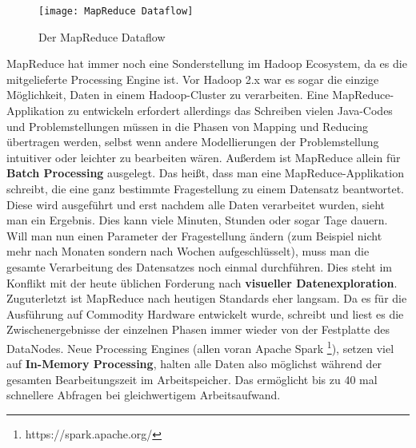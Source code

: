 \begin{figure}[ht]
    \centering
    \texttt{[image: MapReduce Dataflow]}
    \caption[Der MapReduce Dataflow]{Der MapReduce Dataflow\parencite[Seite 24, Figure 2-1]{white_hadoop_2015}}
    \label{fig:mapred dataflow}
\end{figure}

MapReduce hat immer noch eine Sonderstellung im Hadoop Ecosystem, da es die mitgelieferte Processing Engine ist. Vor Hadoop 2.x war es sogar die einzige Möglichkeit, Daten in einem Hadoop-Cluster zu verarbeiten. Eine MapReduce-Applikation zu entwickeln erfordert allerdings das Schreiben vielen Java-Codes und Problemstellungen müssen in die Phasen von Mapping und Reducing übertragen werden, selbst wenn andere Modellierungen der Problemstellung intuitiver oder leichter zu bearbeiten wären. Außerdem ist MapReduce allein für \textbf{Batch Processing} ausgelegt. Das heißt, dass man eine MapReduce-Applikation schreibt, die eine ganz bestimmte Fragestellung zu einem Datensatz beantwortet. Diese wird ausgeführt und erst nachdem alle Daten verarbeitet wurden, sieht man ein Ergebnis. Dies kann viele Minuten, Stunden oder sogar Tage dauern. Will man nun einen Parameter der Fragestellung ändern (zum Beispiel nicht mehr nach Monaten sondern nach Wochen aufgeschlüsselt), muss man die gesamte Verarbeitung des Datensatzes noch einmal durchführen. Dies steht im Konflikt mit der heute üblichen Forderung nach \textbf{visueller Datenexploration}\cite{keim_datenvisualisierung_nodate}. Zuguterletzt ist MapReduce nach heutigen Standards eher langsam. Da es für die Ausführung auf Commodity Hardware entwickelt wurde, schreibt und liest es die Zwischenergebnisse der einzelnen Phasen immer wieder von der Festplatte des DataNodes. Neue Processing Engines (allen voran Apache Spark \footnote{https://spark.apache.org/}), setzen viel auf \textbf{In-Memory Processing}, halten alle Daten also möglichst während der gesamten Bearbeitungszeit im Arbeitspeicher. Das ermöglicht bis zu 40 mal schnellere Abfragen bei gleichwertigem Arbeitsaufwand. \cite[vgl.][Kap. 3.19]{freiknecht_big_2018} 

